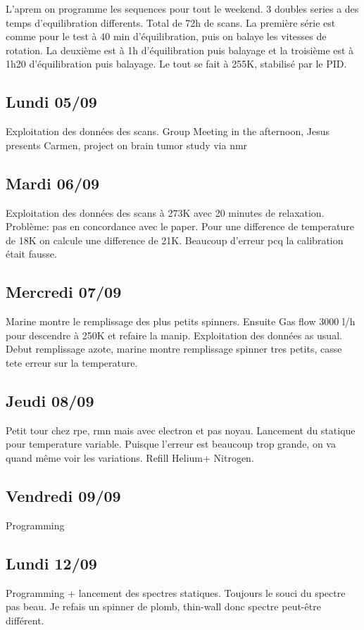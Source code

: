 \documentclass{article}
\begin{document}
L'aprem on programme les sequences pour tout le weekend. 3 doubles series a des temps d'equilibration differents. Total de 72h de scans. La première série est comme pour le test à 40 min d'équilibration, puis on balaye les vitesses de rotation. La deuxième est à 1h d'équilibration puis balayage et la troisième est à 1h20 d'équilibration puis balayage. Le tout se fait à 255K, stabilisé par le PID.

\subsection{Lundi 05/09}
Exploitation des données des scans.
Group Meeting in the afternoon, Jesus presents Carmen, project on brain tumor study via nmr

\subsection{Mardi 06/09}
Exploitation des données des scans à 273K avec 20 minutes de relaxation. Problème: pas en concordance avec le paper. Pour une difference de temperature de 18K on calcule une difference de 21K.
Beaucoup d'erreur pcq la calibration était fausse.

\subsection{Mercredi 07/09}

Marine montre le remplissage des plus petits spinners. Ensuite Gas flow 3000 l/h pour descendre à 250K et refaire la manip. Exploitation des données as usual. Debut remplissage azote, marine montre remplissage spinner tres petits, casse tete erreur sur la temperature.

\subsection{Jeudi 08/09}

Petit tour chez rpe, rmn mais avec electron et pas noyau. Lancement du statique pour temperature variable. Puisque l'erreur est beaucoup trop grande, on va quand même voir les variations. Refill Helium+ Nitrogen.

\subsection{Vendredi 09/09}
Programming

\subsection{Lundi 12/09}
Programming + lancement des spectres statiques. Toujours le souci du spectre pas beau. Je refais un spinner de plomb, thin-wall donc spectre peut-être différent.
\end{document}
